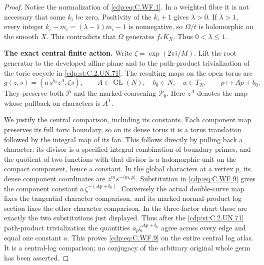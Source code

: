 \begin{proof}
Notice the normalization of \eqref{cdp:eq:C.WF.1}.  In a weighted fibre it
is not necessary that some \(k_i\) be zero.  Positivity of
the \(k_i+1\) gives \(\lambda>0\).  If \(\lambda>1\), every
integer \(k_i-m_i=(\lambda-1)m_i-1\) is nonnegative, so
\(\Omega/t\) is holomorphic on the smooth \(X\).  This
contradicts that \(\Omega\) generates \(f_*K_X\).
Thus \(0<\lambda\le1\).

\par\medskip\noindent\textbf{The exact central finite action.}
Write \(\zeta=\exp(2\pi i/M)\).  Lift the root generator
to the developed affine plane and to the path-product
trivialization of the toric cocycle in \ref{cdp:st:C.2.UN.71}.  The resulting
maps on the open torus are
\[
 g(z,s)=(a\,s^{b_0}z^A,\zeta s),\qquad
 A\in\operatorname{GL}(N),\quad b_0\in N,\quad a\in T_N,
 \qquad p\longmapsto Ap+b_0.
\tag{C.WF.9}\label{cdp:eq:C.WF.9}
\]
They preserve both \(\mathscr P\) and the marked coarsening
\(\mathscr P_0\).  Here \(z^A\) denotes the map whose
pullback on characters is \(A^{\mathsf T}\).

We justify the central comparison, including its constants.
Each component map preserves its full toric boundary, so on
its dense torus it is a torus translation followed by the
integral map of its fan.  This follows directly by pulling
back a character: its divisor is a specified integral
combination of boundary primes, and the quotient of two
functions with that divisor is a holomorphic unit on the
compact component, hence a constant.  In the global
characters at a vertex \(p\), its dense component coordinates
are \(z^m s^{-\langle m,p\rangle}\).  Substitution in
\eqref{cdp:eq:C.WF.9} gives the component constant
\(a\,\zeta^{-(Ap+b_0)}\).
Conversely the actual double-curve map fixes the tangential
character comparison, and its marked normal-product log
section fixes the other character comparison.  In the
three-factor chart these are exactly the two substitutions
just displayed.  Thus after the \ref{cdp:st:C.2.UN.71} path-product
trivialization the quantities
\(a_p\zeta^{Ap+b_0}\) agree across every edge and equal one
constant \(a\).  This proves \eqref{cdp:eq:C.WF.9} on the entire central
log atlas.  It is a central-log comparison; no conjugacy of
the arbitrary original whole germ has been asserted.


\end{proof}
